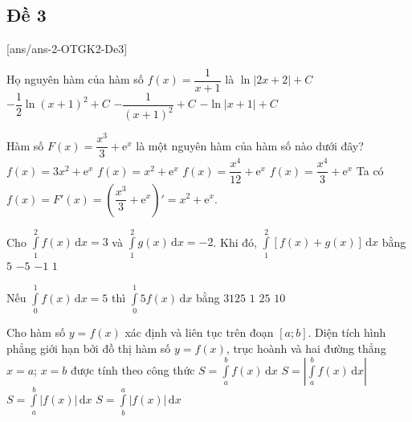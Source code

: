\subsection{Đề 3}
[ans/ans-2-OTGK2-De3]
\caulc
\begin{ex}%
	Họ nguyên hàm của hàm số $f(x)=\dfrac{1}{x+1}$ là
	\choice
	{\True $\ln |2x+2|+C$}
	{$-\dfrac{1}{2}\ln(x+1)^2+C$}
	{$-\dfrac{1}{(x+1)^2}+C$}
	{$-\ln |x+1|+C$}
\end{ex}

\begin{ex}%
	Hàm số $F(x)=\dfrac{x^3}{3}+\mathrm{e}^x$ là một nguyên hàm của hàm số nào dưới đây?
	\choice
	{$f(x)=3x^2+\mathrm{e}^x$}
	{\True $f(x)=x^2+\mathrm{e}^x$}
	{$f(x)=\dfrac{x^4}{12}+\mathrm{e}^x$}
	{$f(x)=\dfrac{x^4}{3}+\mathrm{e}^x$}
	\loigiai
	{
		Ta có $f(x)=F'(x)=\left(\dfrac{x^3}{3}+\mathrm{e}^x\right)'=x^2+\mathrm{e}^x$.
	}
\end{ex}

\begin{ex}%
	Cho $\displaystyle\int\limits_1^2f(x)\mathrm{\,d}x=3$ và $\displaystyle\int\limits_1^2g(x)\mathrm{\,d}x=-2$. Khi đó, $\displaystyle\int\limits_1^2\left[f(x)+g(x)\right]\mathrm{\,d}x$ bằng
	\choice
	{$5$}
	{$-5$}
	{$-1$}
	{\True $1$}
\end{ex}

\begin{ex}%
	Nếu $\displaystyle\int\limits_0^1 f(x) \mathrm{\,d}x=5$ thì $\displaystyle\int\limits_0^1 5f(x) \mathrm{\,d}x$ bằng
	\choice
	{$3125$}
	{$1$}
	{\True $25$}
	{$10$}
\end{ex}

\begin{ex}%
	Cho hàm số $y=f(x)$ xác định và liên tục trên đoạn $[a ; b]$. Diện tích hình phẳng giới hạn bởi đồ thị hàm số $y=f(x)$, trục hoành và hai đường thẳng $x=a $; $x=b$ được tính theo công thức
	\choice
	{$S=\displaystyle\int\limits_a^b f(x) \mathrm{\,d}x$}
	{$S=\left|\displaystyle\int\limits_a^b f(x) \mathrm{\,d}x\right|$}
	{\True $S=\displaystyle\int\limits_a^b \left|f(x)\right| \mathrm{\,d}x$}
	{$S=\displaystyle\int\limits_b^a \left|f(x)\right| \mathrm{\,d}x$}
\end{ex}

